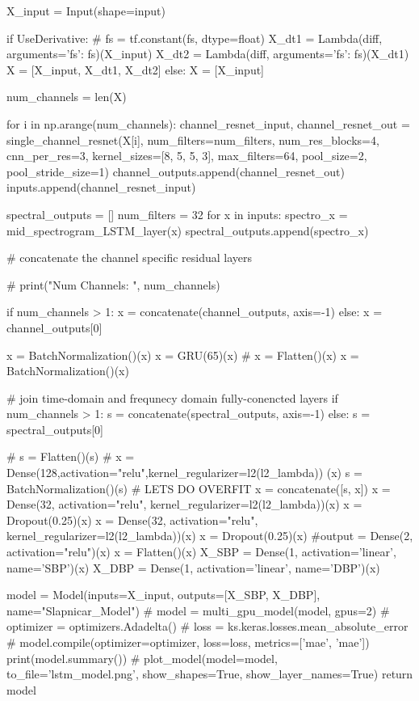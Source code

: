 \begin{python}
    X_input = Input(shape=input)

    if UseDerivative:
        # fs = tf.constant(fs, dtype=float)
        X_dt1 = Lambda(diff, arguments={'fs': fs})(X_input)
        X_dt2 = Lambda(diff, arguments={'fs': fs})(X_dt1)
        X = [X_input, X_dt1, X_dt2]
    else:
        X = [X_input]

    num_channels = len(X)

    for i in np.arange(num_channels):
        channel_resnet_input, channel_resnet_out = single_channel_resnet(X[i], num_filters=num_filters,
        num_res_blocks=4, cnn_per_res=3, kernel_sizes=[8, 5, 5, 3], max_filters=64, pool_size=2, pool_stride_size=1)
        channel_outputs.append(channel_resnet_out)
        inputs.append(channel_resnet_input)

    spectral_outputs = []
    num_filters = 32
    for x in inputs:
        spectro_x = mid_spectrogram_LSTM_layer(x)
        spectral_outputs.append(spectro_x)

    # concatenate the channel specific residual layers

    # print("Num Channels: ", num_channels)

    if num_channels > 1:
        x = concatenate(channel_outputs, axis=-1)
    else:
        x = channel_outputs[0]

    x = BatchNormalization()(x)
    x = GRU(65)(x)
    # x = Flatten()(x)
    x = BatchNormalization()(x)

    # join time-domain and frequnecy domain fully-conencted layers
    if num_channels > 1:
        s = concatenate(spectral_outputs, axis=-1)
    else:
        s = spectral_outputs[0]

    # s = Flatten()(s)
    #     x = Dense(128,activation="relu",kernel_regularizer=l2(l2_lambda)) (x)
    s = BatchNormalization()(s)
    # LETS DO OVERFIT
    x = concatenate([s, x])
    x = Dense(32, activation="relu", kernel_regularizer=l2(l2_lambda))(x)
    x = Dropout(0.25)(x)
    x = Dense(32, activation="relu", kernel_regularizer=l2(l2_lambda))(x)
    x = Dropout(0.25)(x)
    #output = Dense(2, activation="relu")(x)
    x = Flatten()(x)
    X_SBP = Dense(1, activation='linear', name='SBP')(x)
    X_DBP = Dense(1, activation='linear', name='DBP')(x)

    model = Model(inputs=X_input, outputs=[X_SBP, X_DBP], name="Slapnicar_Model")
    # model = multi_gpu_model(model, gpus=2)
    # optimizer = optimizers.Adadelta()
    # loss = ks.keras.losses.mean_absolute_error
    # model.compile(optimizer=optimizer, loss=loss, metrics=['mae', 'mae'])
    print(model.summary())
    # plot_model(model=model, to_file='lstm_model.png', show_shapes=True, show_layer_names=True)
    return model



\end{python}

